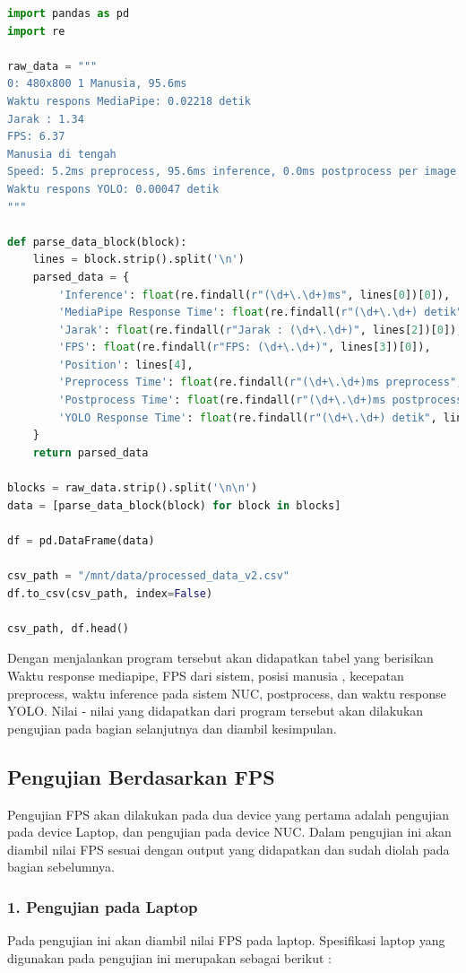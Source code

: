 \begin{lstlisting}[language = python]
import pandas as pd
import re

raw_data = """
0: 480x800 1 Manusia, 95.6ms
Waktu respons MediaPipe: 0.02218 detik
Jarak : 1.34
FPS: 6.37
Manusia di tengah
Speed: 5.2ms preprocess, 95.6ms inference, 0.0ms postprocess per image at shape (1, 3, 480, 800)
Waktu respons YOLO: 0.00047 detik
"""

def parse_data_block(block):
    lines = block.strip().split('\n')
    parsed_data = {
        'Inference': float(re.findall(r"(\d+\.\d+)ms", lines[0])[0]),
        'MediaPipe Response Time': float(re.findall(r"(\d+\.\d+) detik", lines[1])[0]),
        'Jarak': float(re.findall(r"Jarak : (\d+\.\d+)", lines[2])[0]),
        'FPS': float(re.findall(r"FPS: (\d+\.\d+)", lines[3])[0]),
        'Position': lines[4],
        'Preprocess Time': float(re.findall(r"(\d+\.\d+)ms preprocess", lines[5])[0]),
        'Postprocess Time': float(re.findall(r"(\d+\.\d+)ms postprocess", lines[5])[0]),
        'YOLO Response Time': float(re.findall(r"(\d+\.\d+) detik", lines[6])[0])
    }
    return parsed_data

blocks = raw_data.strip().split('\n\n')
data = [parse_data_block(block) for block in blocks]

df = pd.DataFrame(data)

csv_path = "/mnt/data/processed_data_v2.csv"
df.to_csv(csv_path, index=False)

csv_path, df.head()
\end{lstlisting}

Dengan menjalankan program tersebut akan didapatkan tabel yang berisikan Waktu response mediapipe, FPS dari sistem, posisi manusia , kecepatan preprocess, waktu inference pada sistem NUC, postprocess, dan waktu response YOLO. Nilai - nilai yang didapatkan dari program tersebut akan dilakukan pengujian pada bagian selanjutnya dan diambil kesimpulan.  

\subsection{Pengujian Berdasarkan FPS}
Pengujian FPS akan dilakukan pada dua device yang pertama adalah pengujian pada device Laptop, dan pengujian pada device NUC. Dalam pengujian ini akan diambil nilai FPS sesuai dengan output yang didapatkan dan sudah diolah pada bagian sebelumnya.

\subsubsection{1. Pengujian pada Laptop}
Pada pengujian ini akan diambil nilai FPS pada laptop. Spesifikasi laptop yang digunakan pada pengujian ini merupakan sebagai berikut :

